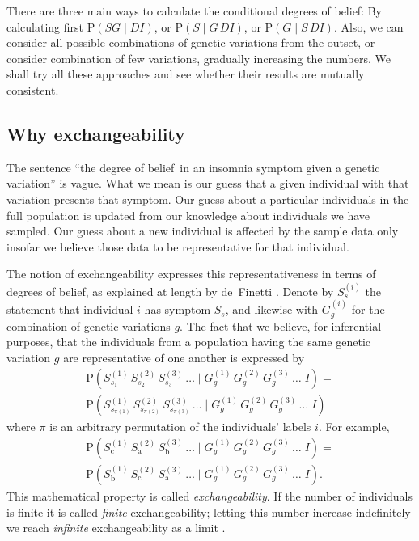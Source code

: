 \documentclass[\ifafour a4paper,12pt,\else a5paper,10pt,\fi%
onecolumn,oneside,article,%
british%
]{memoir}
\theoremstyle{remark}
\theoremstyle{innote}
\newcommand*{\citep}{\parencites}
\newcommand*{\citey}{\parencites*}
\newcommand*{\p}{\mathrm{P}}%
\renewcommand*{\|}{\mathpunct{|}}
\newcommand*{\dob}{degree of belief}
\newcommand*{\dobs}{degrees of belief}
\newcommand*{\yD}{D}
\newcommand*{\yG}{G}
\newcommand*{\yS}{S}
\newcommand*{\yI}{I}
\newcommand*{\yGi}[1]{G^{(#1)}}
\newcommand*{\ySi}[1]{S^{(#1)}}
\begin{document}
There are three main ways to calculate the conditional \dobs: By
calculating first $\p(\yS\yG \|\yD\yI)$, or $\p(\yS \|\yG\,\yD\yI)$, or
$\p(\yG \|\yS\,\yD\yI)$. Also, we can consider all possible combinations of
genetic variations from the outset, or consider combination of few
variations, gradually increasing the numbers. We shall try all these
approaches and see whether their results are mutually consistent.


\subsection{Why exchangeability}
\label{sec:pre_why_exchangeability}



The sentence \enquote{the \dob\ in an insomnia symptom given a genetic
  variation} is vague. What we mean is our guess that a given individual
with that variation presents that symptom. Our guess about a particular
individuals in the full population is updated from our knowledge about
individuals we have sampled. Our guess about a new individual is affected
by the sample data only insofar we believe those data to be representative
for that individual.

The notion of exchangeability expresses this representativeness in
 terms of \dobs, as explained at length by de~Finetti
\citey{definetti1931,definetti1937,definetti1938}. Denote by $\ySi{i}_s$
the statement that individual $i$ has symptom $\yS_s$, and likewise with
$\yGi{i}_g$ for the combination of genetic variations $g$. The fact that we
believe, for inferential purposes, that the individuals from a population
having the same genetic variation $g$ are representative of one another is
expressed by
\begin{multline}
\label{def_exchangeability}
  \p(\ySi{1}_{s_1}\, \ySi{2}_{s_2}\, \ySi{3}_{s_3}\,\dotso \|
  \yGi{1}_{g}\, \yGi{2}_{g}\, \yGi{3}_{g}\,\dotso
  \;\yI)
  ={}\\
  \p(\ySi{1}_{s_{\pi(1)}}\, \ySi{2}_{s_{\pi(2)}}\, \ySi{3}_{s_{\pi(3)}}\,\dotso \|
  \yGi{1}_{g}\, \yGi{2}_{g}\, \yGi{3}_{g}\,\dotso
  \;\yI)
\end{multline}
where $\pi$ is an arbitrary permutation of the individuals' labels $i$. For
example,
\begin{multline}
\label{example_exchangeability}
  \p(\ySi{1}_{\text{c}}\, \ySi{2}_{\text{a}}\, \ySi{3}_{\text{b}}\,\dotso \|
  \yGi{1}_{g}\, \yGi{2}_{g}\, \yGi{3}_{g}\,\dotso
  \;\yI)
  ={}\\
  \p(\ySi{1}_{\text{b}}\, \ySi{2}_{\text{c}}\, \ySi{3}_{\text{a}}\,\dotso \|
  \yGi{1}_{g}\, \yGi{2}_{g}\, \yGi{3}_{g}\,\dotso
  \;\yI).
\end{multline}
This mathematical property is called \emph{exchangeability}.
If the number of individuals is finite it is called \emph{finite}
exchangeability; letting this number increase indefinitely we reach
\emph{infinite} exchangeability as a limit \citep{heathetal1976}.
\end{document}

